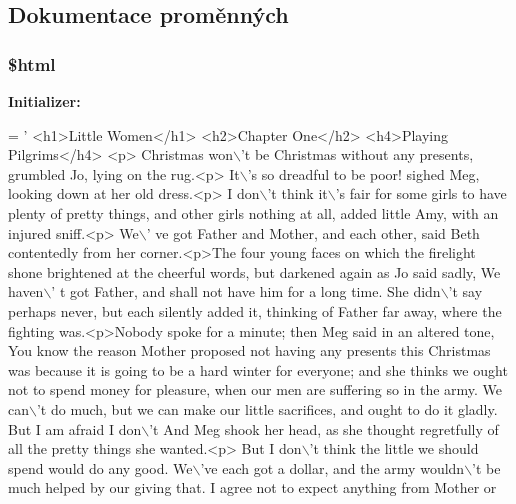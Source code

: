 \subsection{Dokumentace proměnných}
\hypertarget{example21__hyphenation_8php_a6f96e7fc92441776c9d1cd3386663b40}{
\subsubsection[{\$html}]{\setlength{\rightskip}{0pt plus 5cm}\$html}}\label{example21__hyphenation_8php_a6f96e7fc92441776c9d1cd3386663b40}
{\bfseries Initializer\-:}
\begin{DoxyCode}
= \textcolor{stringliteral}{'}
\textcolor{stringliteral}{<h1>Little Women</h1>}
\textcolor{stringliteral}{<h2>Chapter One</h2>}
\textcolor{stringliteral}{<h4>Playing Pilgrims</h4>}
\textcolor{stringliteral}{}
\textcolor{stringliteral}{<p> Christmas won\(\backslash\)'t be Christmas without any presents,  grumbled Jo, lying on the rug.<p> It\(\backslash\)'s so
       dreadful to be poor!  sighed Meg, looking down at her old dress.<p> I don\(\backslash\)'t think it\(\backslash\)'s fair for some girls to
       have plenty of pretty things, and other girls nothing at all,  added little Amy, with an injured sniff.<p> We\(\backslash\)'
      ve got Father and Mother, and each other,  said Beth contentedly from her corner.<p>The four young faces on
       which the firelight shone brightened at the cheerful words, but darkened again as Jo said sadly,  We haven\(\backslash\)'
      t got Father, and shall not have him for a long time.  She didn\(\backslash\)'t say  perhaps never,  but each silently
       added it, thinking of Father far away, where the fighting was.<p>Nobody spoke for a minute; then Meg said in
       an altered tone,  You know the reason Mother proposed not having any presents this Christmas was because it
       is going to be a hard winter for everyone; and she thinks we ought not to spend money for pleasure, when our
       men are suffering so in the army. We can\(\backslash\)'t do much, but we can make our little sacrifices, and ought to do
       it gladly. But I am afraid I don\(\backslash\)'t  And Meg shook her head, as she thought regretfully of all the pretty
       things she wanted.<p> But I don\(\backslash\)'t think the little we should spend would do any good. We\(\backslash\)'ve each got a
       dollar, and the army wouldn\(\backslash\)'t be much helped by our giving that. I agree not to expect anything from Mother or
}
\end{DoxyCode}
